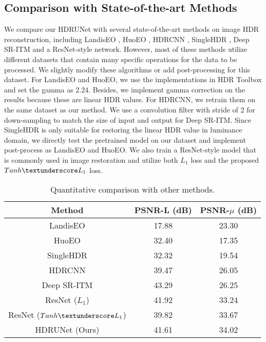 \documentclass[final]{cvpr}
\begin{document}
\subsection{Comparison with State-of-the-art Methods}
We compare our HDRUNet with several state-of-the-art methods on image HDR reconstruction, including LandisEO \cite{landis2002production}, HuoEO \cite{huo2013dodging}, HDRCNN \cite{eilertsen2017hdr}, SingleHDR \cite{liu2020single}, Deep SR-ITM \cite{kim2019deep} and a ResNet-style \cite{he2016deep} network. However, most of these methods utilize different datasets that contain many specific operations for the data to be processed. We slightly modify these algorithms or add post-processing for this dataset. For LandisEO and HuoEO, we use the implementations in HDR Toolbox \cite{Banterle:2017} and set the gamma as 2.24. Besides, we implement gamma correction on the results because these are linear HDR values. For HDRCNN, we retrain them on the same dataset as our method. We use a convolution filter with stride of 2 for down-sampling to match the size of input and output for Deep SR-ITM. Since SingleHDR is only suitable for restoring the linear HDR value in luminance domain, we directly test the pretrained model on our dataset and implement post-process as LandisEO and HuoEO. We also train a ResNet-style model that is commonly used in image restoration and utilize both $L_1$ loss and the proposed $Tanh \textunderscore L_1$ loss.

\begin{table}[htbp]
	\begin{center}
		\begin{tabular}{ccc}
			\toprule
			Method & PSNR-L (dB) & PSNR-$\mu$ (dB) \\ \hline
			LandisEO & 17.88 & 23.30 \\ 
			HuoEO & 32.40 & 17.35 \\ 
			SingleHDR & 32.32 & 19.54 \\ 
			HDRCNN & 39.47 & 26.05 \\ 
			Deep SR-ITM & 43.29 & 26.25 \\ 
			ResNet ($L_1$) & 41.92 & 33.24 \\ 
			ResNet ($Tanh \textunderscore L_1$) & 39.82 & 33.67 \\ 
			HDRUNet (Ours) & 41.61 & 34.02 \\ 
			\bottomrule
		\end{tabular}
		
	\end{center}
	\caption{Quantitative comparison with other methods.}
	\label{tab:Quantitative Comparison}
\end{table}
\end{document}
